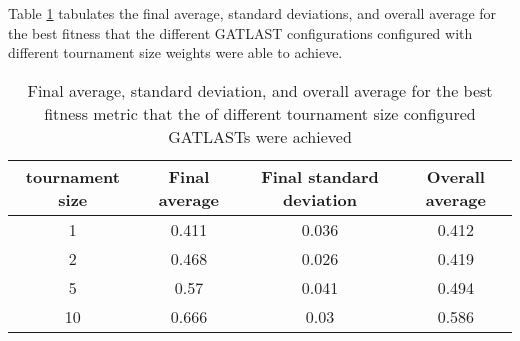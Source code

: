 Table \ref{tab:HP:GA:tournamentSize:best fitness} tabulates the final average, standard deviations, and overall average for the best fitness that the different GATLAST configurations configured with different tournament size weights were able to achieve.
\begin{table}[tbh!]
\centering
\begin{adjustbox}{trim=0cm 0cm 0cm 0cm, clip=true}
\begin{tabular}{|c|c|c|c|}
\hline
tournament size & Final average & Final standard deviation & Overall average\\
\hline
1 & 0.411 & 0.036 & 0.412\\\hline
2 & 0.468 & 0.026 & 0.419\\\hline
5 & 0.57 & 0.041 & 0.494\\\hline
10 & 0.666 & 0.03 & 0.586\\\hline
\end{tabular}
\end{adjustbox}
\caption{Final average, standard deviation, and overall average for the best fitness metric that the of different tournament size configured GATLASTs were achieved}
\label{tab:HP:GA:tournamentSize:best fitness}
\end{table}